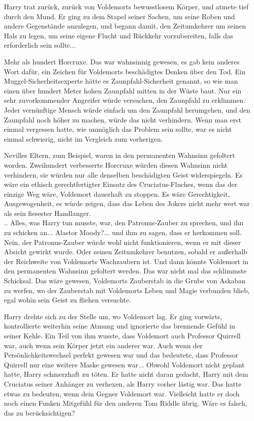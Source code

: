 {Harry trat zurück, zurück von Voldemorts bewusstlosem Körper, und atmete tief durch den Mund. Er ging zu dem Stapel seiner Sachen, um seine Roben und andere Gegenstände anzulegen, und begann damit, den Zeitumkehrer um seinen Hals zu legen, um seine eigene Flucht und Rückkehr vorzubereiten, falls das erforderlich sein sollte...

Mehr als hundert Horcruxe. Das war wahnsinnig gewesen, es gab kein anderes Wort dafür, ein Zeichen für Voldemorts beschädigtes Denken über den Tod. Ein Muggel-Sicherheitsexperte hätte es Zaunpfahl-Sicherheit genannt, so wie man einen über hundert Meter hohen Zaunpfahl mitten in der Wüste baut. Nur ein sehr zuvorkommender Angreifer würde versuchen, den Zaunpfahl zu erklimmen. Jeder vernünftige Mensch würde einfach um den Zaunpfahl herumgehen, und den Zaunpfahl noch höher zu machen, würde das nicht verhindern. Wenn man erst einmal vergessen hatte, wie unmöglich das Problem sein sollte, war es nicht einmal schwierig, nicht im Vergleich zum vorherigen.

Nevilles Eltern, zum Beispiel, waren in den permanenten Wahnsinn gefoltert worden. Zweihundert verbesserte Horcruxe würden diesen Wahnsinn nicht verhindern, sie würden nur alle denselben beschädigten Geist widerspiegeln. Es wäre ein ethisch gerechtfertigter Einsatz des Cruciatus-Fluches, wenn das der einzige Weg wäre, Voldemort dauerhaft zu stoppen. Es wäre Gerechtigkeit, Ausgewogenheit, es würde zeigen, dass das Leben des Jokers nicht mehr wert war als sein fiesester Handlanger.\\ .. Alles, was Harry tun musste, war, den Patronus-Zauber zu sprechen, und ihn zu schicken an... Alastor Moody?... und ihm zu sagen, dass er herkommen soll. Nein, der Patronus-Zauber würde wohl nicht funktionieren, wenn er mit dieser Absicht gewirkt wurde. Oder seinen Zeitumkehrer benutzen, sobald er außerhalb der Reichweite von Voldemorts Wachzaubern ist. Und dann könnte Voldemort in den permanenten Wahnsinn gefoltert werden. Das war nicht mal das schlimmste Schicksal. Das wäre gewesen, Voldemorts Zauberstab in die Grube von Askaban zu werfen, wo der Zauberstab mit Voldemorts Leben und Magie verbunden blieb, egal wohin sein Geist zu fliehen versuchte.

Harry drehte sich zu der Stelle um, wo Voldemort lag. Er ging vorwärts, kontrollierte weiterhin seine Atmung und ignorierte das brennende Gefühl in seiner Kehle. Ein Teil von ihm wusste, dass Voldemort auch Professor Quirrell war, auch wenn sein Körper jetzt ein anderer war. Auch wenn der Persönlichkeitswechsel perfekt gewesen war und das bedeutete, dass Professor Quirrell nur eine weitere Maske gewesen war... Obwohl Voldemort nicht geplant hatte, Harry schmerzhaft zu töten. Er hatte nicht daran gedacht, Harry mit dem Cruciatus seiner Anhänger zu verhexen, als Harry vorher lästig war. Das hatte etwas zu bedeuten, wenn dein Gegner Voldemort war. Vielleicht hatte er doch noch einen Funken Mitgefühl für den anderen Tom Riddle übrig. Wäre es falsch, das zu berücksichtigen?

}

